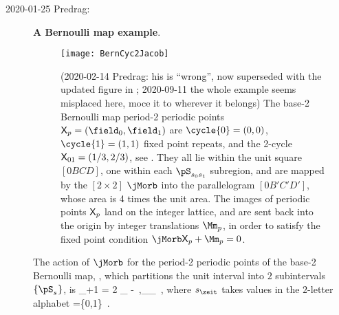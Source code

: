 \begin{description}
\item[2020-01-25 Predrag:] {\bf A Bernoulli map example}.
\begin{figure}
  \centering
\texttt{[image: BernCyc2Jacob]}
  \caption{\label{fig:BernCyc2Jacob}
(2020-02-14 Predrag: his is ``wrong'', now superseded with the updated
figure in ; 2020-09-11 the whole example seems misplaced
here, moce it to wherever it belongs)
The base-2 Bernoulli map  period-2 periodic points
$\Xx_p=(\field_0,\field_1)$ are $\cycle{0}=(0,0)$, $\cycle{1}=(1,1)$ fixed
point repeats, and the 2-cycle $\mathsf{X}_{01}=({1}/{3},{2}/{3})$,
see .
They all lie within the unit square $[0BCD]$, one within each
$\pS_{\Ssym{0}\Ssym{1}}$ subregion, and are mapped by the
$[2\!\times\!2]$ {\jacobianOrb} $\jMorb$
into the parallelogram $[0B'C'D']$, whose area is 4 times the unit area.
The images of periodic points $\mathsf{X}_p$ land on the integer lattice, and
are sent back into the origin by integer translations $\Mm_p$, in order
to satisfy the fixed point condition
$\jMorb\Xx_p+\Mm_p=0$.
          }
\end{figure}
%
The action of {\jacobianOrb}
$\jMorb$ for the period-2 periodic points of the base-2 Bernoulli map,
,
which partitions the unit interval into ${2}$ subintervals
$\{\pS_\Ssym{}\}$, is
\beq
\field_{\zeit+1}
= {2} \field_{\zeit} - 
\,,\qquad  \field_{\zeit}\in\pS_{\Ssym{\zeit}}
\,,
where $\Ssym{\zeit}$ takes values in the ${2}$-letter alphabet
\beq
\Ssym{} \in \A=\{0,1\}
\,.


\end{description}
